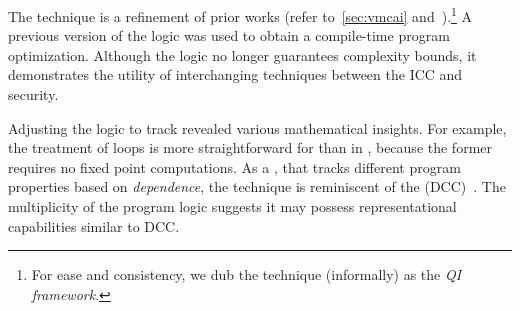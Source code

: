 The technique is a refinement of prior works (refer to~\autoref{sec:vmcai} and~\cite{moyen20172}).\footnote{
For ease and consistency, we dub the technique (informally) as the \emph{QI framework}.}
A previous version of the logic was used to obtain a compile-time program optimization.
Although the logic no longer guarantees complexity bounds, it demonstrates the utility of interchanging techniques between the ICC and security.

Adjusting the logic to track  revealed various mathematical insights.
For example, the treatment of loops is more straightforward for  than in ,
because the former requires no fixed point computations.
As a , that tracks different program properties based on \emph{dependence},
the technique is reminiscent of the  (DCC)~\cite{abadi1999b}.
The multiplicity of the program logic suggests it may possess representational capabilities similar to DCC\@.
